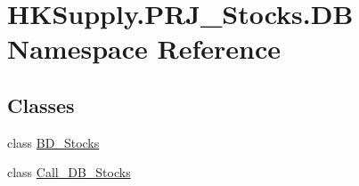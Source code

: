 \hypertarget{namespace_h_k_supply_1_1_p_r_j___stocks_1_1_d_b}{}\section{H\+K\+Supply.\+P\+R\+J\+\_\+\+Stocks.\+DB Namespace Reference}
\label{namespace_h_k_supply_1_1_p_r_j___stocks_1_1_d_b}
\subsection*{Classes}
\begin{DoxyCompactItemize}
\item 
class \mbox{\hyperlink{class_h_k_supply_1_1_p_r_j___stocks_1_1_d_b_1_1_b_d___stocks}{B\+D\+\_\+\+Stocks}}
\item 
class \mbox{\hyperlink{class_h_k_supply_1_1_p_r_j___stocks_1_1_d_b_1_1_call___d_b___stocks}{Call\+\_\+\+D\+B\+\_\+\+Stocks}}
\end{DoxyCompactItemize}
